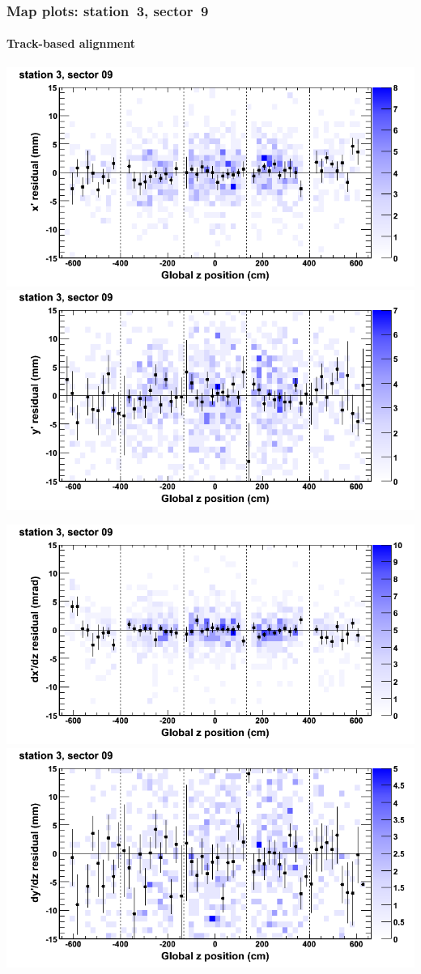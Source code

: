 \documentclass[compress]{beamer}
\begin{document}
\begin{frame}
\frametitle{Map plots: station~3, sector~9}
\framesubtitle{Track-based alignment}
\includegraphics[width=0.5\linewidth]{mapplots_re05/DTvsz_st3sec09_x.png}
\includegraphics[width=0.5\linewidth]{mapplots_re05/DTvsz_st3sec09_y.png}

\includegraphics[width=0.5\linewidth]{mapplots_re05/DTvsz_st3sec09_dxdz.png}
\includegraphics[width=0.5\linewidth]{mapplots_re05/DTvsz_st3sec09_dydz.png}
\end{frame}
\end{document}
